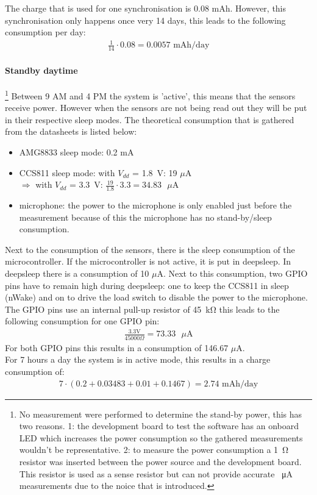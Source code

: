 \documentclass[11pt,a4paper]{article}
\begin{document}
The charge that is used for one synchronisation is 0.08 mAh. However, this synchronisation only happens once very 14 days, this leads to the following consumption per day:
\begin{gather*}
	\frac{1}{14} \cdot 0.08 = 0.0057 \text{ mAh/day}
\end{gather*}

\paragraph{Standby daytime}\footnote{No measurement were performed to determine the stand-by power, this has two reasons. 1: the development board to test the software has an onboard LED which increases the power consumption so the gathered measurements wouldn't be representative. 2: to measure the power consumption a \SI{1}{\ohm} resistor was inserted between the power source and the development board. This resistor is used as a sense resistor but can not provide accurate \SI{}{\micro\ampere} measurements due to the noice that is introduced. }
Between 9 AM and 4 PM the system is 'active', this means that the sensors receive power. However when the sensors are not being read out they will be put in their respective sleep modes. The theoretical consumption that is gathered from the datasheets is listed below:
\begin{itemize}
	\item AMG8833 sleep mode: 0.2 mA
	\item CCS811 sleep mode: with $V_{dd}$ = \SI{1.8}{\volt}: 19 $\mu$A \\$\Rightarrow$ with $V_{dd}$ = \SI{3.3}{\volt}: $\frac{19}{1.8}\cdot 3.3 = 34.83 \text{ }\mu\text{A}$
	\item microphone: the power to the microphone is only enabled just before the measurement because of this the microphone has no stand-by/sleep consumption. 
\end{itemize}
Next to the consumption of the sensors, there is the sleep consumption of the microcontroller. If the microcontroller is not active, it is put in deepsleep. In deepsleep there is a consumption of 10 $\mu$A. Next to this consumption, two GPIO pins have to remain high during deepsleep: one to keep the CCS811 in sleep (nWake) and on to drive the load switch to disable the power to the microphone. The GPIO pins use an internal pull-up resistor of \SI{45}{\kilo\ohm} this leads to the following consumption for one GPIO pin: 
\begin{gather*}
	\frac{3.3 \text{V}}{45000\Omega} = 73.33 \text{ } \mu\text{A} 
\end{gather*}
For both GPIO pins this results in a consumption of 146.67 $\mu$A.
\\
For 7 hours a day the system is in active mode, this results in a charge consumption of:
\begin{gather*}
	7 \cdot (0.2 + 0.03483 + 0.01 + 0.1467) = 2.74\text{ mAh/day}
\end{gather*}
\end{document}
